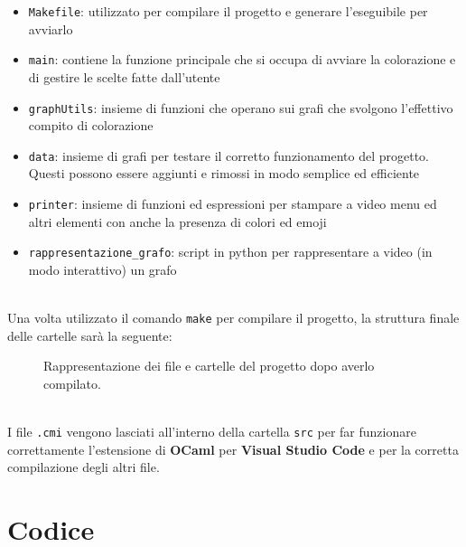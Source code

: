 \begin{itemize}
	\item \lstinline[style=cmd]|Makefile|: utilizzato per compilare il progetto e generare l'eseguibile per avviarlo
	\item \lstinline[style=cmd]|main|: contiene la funzione principale che si occupa di avviare la colorazione e di gestire le scelte fatte dall'utente
	\item \lstinline[style=cmd]|graphUtils|: insieme di funzioni che operano sui grafi che svolgono l'effettivo compito di colorazione
	\item \lstinline[style=cmd]|data|: insieme di grafi per testare il corretto funzionamento del progetto. Questi possono essere aggiunti e rimossi in modo semplice ed efficiente
	\item \lstinline[style=cmd]|printer|: insieme di funzioni ed espressioni per stampare a video menu ed altri elementi con anche la presenza di colori ed emoji
	\item \lstinline[style=cmd]|rappresentazione_grafo|: script in python per rappresentare a video (in modo interattivo) un grafo
\end{itemize}
\ \\
Una volta utilizzato il comando \lstinline[style=cmd]|make| per compilare il progetto, la struttura finale delle cartelle sarà la seguente:

\begin{figure}[H]
	\caption{Rappresentazione dei file e cartelle del progetto dopo averlo compilato.}
\end{figure}
\ \\
I file \lstinline[style=cmd]|.cmi| vengono lasciati all'interno della cartella \lstinline[style=cmd]|src| per far funzionare correttamente l'estensione di \textbf{OCaml} per \textbf{Visual Studio Code} e per la corretta compilazione degli altri file.

\section{Codice}
